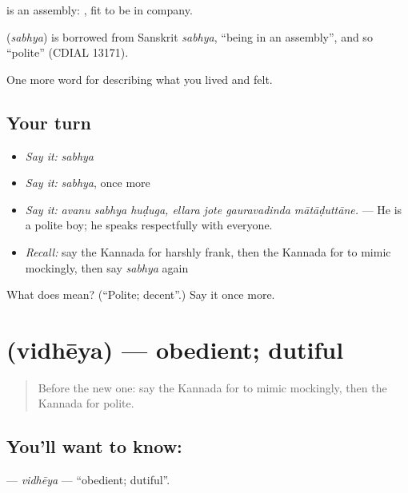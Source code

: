  is an assembly: , fit to be in company.

\begin{cousinweb}
\textbf{} (\emph{sabhya}) is borrowed from Sanskrit \emph{sabhya}, \textquotedblleft{}being in an assembly\textquotedblright{}, and so \textquotedblleft{}polite\textquotedblright{} (CDIAL 13171).
\end{cousinweb}

\begin{grammarlens}[title={What you've built}]
One more word for describing what you lived and felt.
\end{grammarlens}

\subsection*{Your turn}
\begin{itemize}
\raggedright
  \item \emph{Say it:} \emph{sabhya}
  \item \emph{Say it:} \emph{sabhya}, once more
  \item \emph{Say it:} \emph{avanu sabhya huḍuga, ellara jote gauravadinda mātāḍuttāne.} — He is a polite boy; he speaks respectfully with everyone.
  \item \emph{Recall:} say the Kannada for harshly frank, then the Kannada for to mimic mockingly, then say \emph{sabhya} again
\end{itemize}

\begin{tcolorbox}[breakable,colback=teal!4,colframe=teal!35!black,title={Before you move on}]
What does  mean? (\textquotedblleft{}Polite; decent\textquotedblright{}.) Say it once more.
\end{tcolorbox}
\section[\texorpdfstring{\kn{ವಿಧೇಯ} (vidhēya)}{ವಿಧೇಯ (vidhēya)}]{ (vidhēya) — obedient; dutiful}

\label{lesson:KA-C502-vidheya}



\begin{quote}
Before the new one: say the Kannada for to mimic mockingly, then the Kannada for polite.
\end{quote}

\subsection*{You'll want to know: }
\textbf{} — \emph{vidhēya} — \textquotedblleft{}obedient; dutiful\textquotedblright{}.

